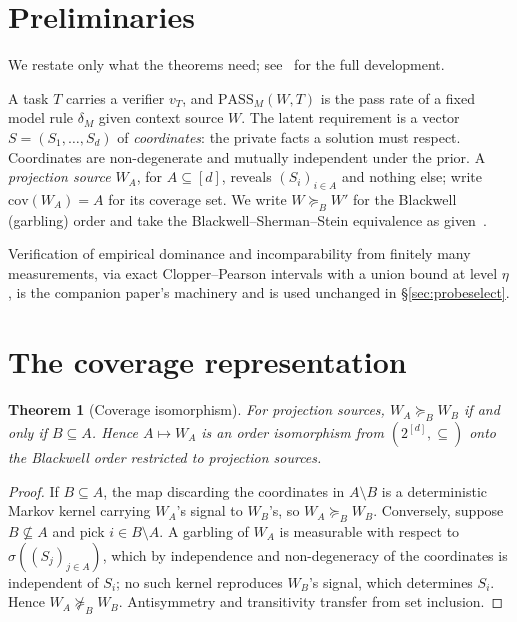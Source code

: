 \documentclass[11pt]{article}
\theoremstyle{plain}
\newtheorem{theorem}{Theorem}
\theoremstyle{definition}
\theoremstyle{remark}
\newcommand{\PASS}{\mathrm{PASS}}
\newcommand{\Bord}{\succeq_{B}}
\newcommand{\cov}{\mathrm{cov}}
\begin{document}
\section{Preliminaries}
\label{sec:prelim}

We restate only what the theorems need; see~\citet{companion} for the full development.

A task $T$ carries a verifier $v_T$, and $\PASS_M(W,T)$ is the pass rate of a fixed model rule
$\delta_M$ given context source $W$. The latent requirement is a vector
$S=(S_1,\dots,S_d)$ of \emph{coordinates}: the private facts a solution must respect. Coordinates
are non-degenerate and mutually independent under the prior. A \emph{projection source} $W_A$, for
$A \subseteq [d]$, reveals $(S_i)_{i \in A}$ and nothing else; write $\cov(W_A) = A$ for its
coverage set. We write $W \Bord W'$ for the Blackwell (garbling) order and take the
Blackwell--Sherman--Stein equivalence as given~\citep{blackwell1953,torgersen1991}.

Verification of empirical dominance and incomparability from finitely many measurements, via exact
Clopper--Pearson intervals with a union bound at level $\eta$, is the companion paper's machinery
and is used unchanged in \S\ref{sec:probeselect}.

\section{The coverage representation}
\label{sec:coverage}

\begin{theorem}[Coverage isomorphism]\label{thm:iso}
For projection sources, $W_A \Bord W_B$ if and only if $B \subseteq A$. Hence $A \mapsto W_A$ is an
order isomorphism from $(2^{[d]},\subseteq)$ onto the Blackwell order restricted to projection
sources.
\end{theorem}

\begin{proof}
If $B \subseteq A$, the map discarding the coordinates in $A \setminus B$ is a deterministic Markov
kernel carrying $W_A$'s signal to $W_B$'s, so $W_A \Bord W_B$. Conversely, suppose $B \not\subseteq
A$ and pick $i \in B \setminus A$. A garbling of $W_A$ is measurable with respect to
$\sigma((S_j)_{j \in A})$, which by independence and non-degeneracy of the coordinates is
independent of $S_i$; no such kernel reproduces $W_B$'s signal, which determines $S_i$. Hence
$W_A \not\Bord W_B$. Antisymmetry and transitivity transfer from set inclusion.
\end{proof}
\end{document}
